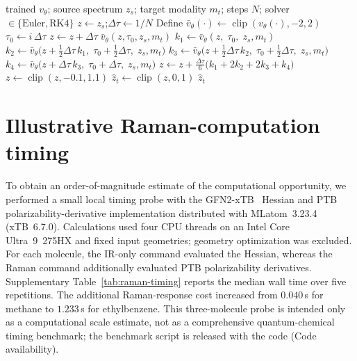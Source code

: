 \documentclass[pdflatex,sn-mathphys-num]{sn-jnl}%
\theoremstyle{thmstyleone}%
\theoremstyle{thmstyletwo}%
\theoremstyle{thmstylethree}%
\begin{document}
\begin{appendices}
\begin{algorithm}[!htb]
\small
\caption{\textsc{ODESample}: deterministic flow integration}\label{alg:sample}
\begin{algorithmic}[1]
\Require trained $v_\theta$; source spectrum $z_s$; target modality $m_t$; steps $N$; solver $\in\{\text{Euler},\text{RK4}\}$
\State $z \gets z_s$;\quad $\Delta\tau \gets 1/N$
\State Define $\bar v_\theta(\cdot)\gets\operatorname{clip}(v_\theta(\cdot),-2,2)$
  \State $\tau_0 \gets i\,\Delta\tau$
     \State $z \gets z + \Delta\tau\; \bar v_\theta(z,\tau_0,z_s,m_t)$
  \Else {}
     \State $k_1 \gets \bar v_\theta(z,\;\tau_0,\;z_s,m_t)$
     \State $k_2 \gets \bar v_\theta\big(z+\tfrac12\Delta\tau\,k_1,\;\tau_0+\tfrac12\Delta\tau,\;z_s,m_t\big)$
     \State $k_3 \gets \bar v_\theta\big(z+\tfrac12\Delta\tau\,k_2,\;\tau_0+\tfrac12\Delta\tau,\;z_s,m_t\big)$
     \State $k_4 \gets \bar v_\theta\big(z+\Delta\tau\,k_3,\;\tau_0+\Delta\tau,\;z_s,m_t\big)$
     \State $z \gets z + \tfrac{\Delta\tau}{6}\big(k_1+2k_2+2k_3+k_4\big)$
  \EndIf
     \State $z\gets\operatorname{clip}(z,-0.1,1.1)$
  \EndIf
\EndFor
\State $\hat z_t \gets \operatorname{clip}(z,0,1)$ 
\State \Return $\hat z_t$
\end{algorithmic}
\end{algorithm}

\section{Illustrative Raman-computation timing}\label{app:raman-timing}

To obtain an order-of-magnitude estimate of the computational opportunity, we performed a small local timing probe with the GFN2-xTB~\citep{bannwarth2019gfn2} Hessian and PTB~\citep{grimme2023ptb} polarizability-derivative implementation distributed with MLatom~3.23.4~\citep{dral2024mlatom} (xTB~6.7.0). Calculations used four CPU threads on an Intel Core Ultra~9~275HX and fixed input geometries; geometry optimization was excluded. For each molecule, the IR-only command evaluated the Hessian, whereas the Raman command additionally evaluated PTB polarizability derivatives. Supplementary Table~\ref{tab:raman-timing} reports the median wall time over five repetitions. The additional Raman-response cost increased from $0.040$\,s for methane to $1.233$\,s for ethylbenzene. This three-molecule probe is intended only as a computational scale estimate, not as a comprehensive quantum-chemical timing benchmark; the benchmark script is released with the code (Code availability).


\end{appendices}
\end{document}
